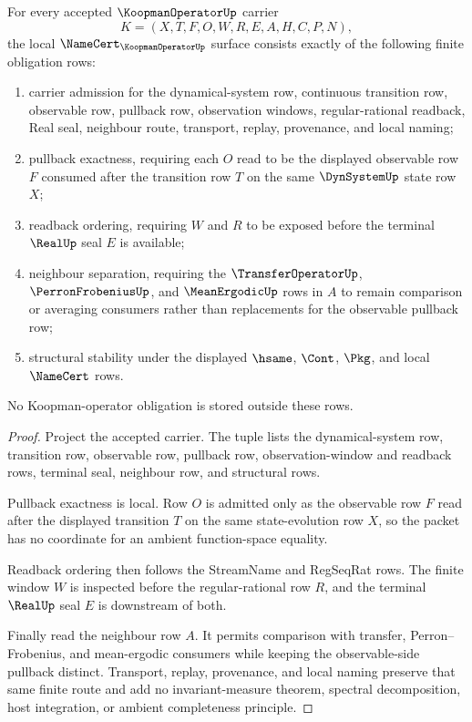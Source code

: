 \begin{theorem}
\label{thm:koopman-operator-namecert-obligations}
For every accepted $\KoopmanOperatorUp$ carrier
$$
K=(X,T,F,O,W,R,E,A,H,C,P,N),
$$
the local $\NameCert_{\KoopmanOperatorUp}$ surface consists exactly of the following finite obligation rows:
\begin{enumerate}
\item carrier admission for the dynamical-system row, continuous transition row, observable row, pullback row, observation windows, regular-rational readback, Real seal, neighbour route, transport, replay, provenance, and local naming;
\item pullback exactness, requiring each $O$ read to be the displayed observable row $F$ consumed after the transition row $T$ on the same $\DynSystemUp$ state row $X$;
\item readback ordering, requiring $W$ and $R$ to be exposed before the terminal $\RealUp$ seal $E$ is available;
\item neighbour separation, requiring the $\TransferOperatorUp$, $\PerronFrobeniusUp$, and $\MeanErgodicUp$ rows in $A$ to remain comparison or averaging consumers rather than replacements for the observable pullback row;
\item structural stability under the displayed $\hsame$, $\Cont$, $\Pkg$, and local $\NameCert$ rows.
\end{enumerate}
No Koopman-operator obligation is stored outside these rows.
\end{theorem}
\begin{proof}
Project the accepted carrier. The tuple lists the dynamical-system row, transition row, observable row, pullback row, observation-window and readback rows, terminal seal, neighbour row, and structural rows.

Pullback exactness is local. Row $O$ is admitted only as the observable row $F$ read after the displayed transition $T$ on the same state-evolution row $X$, so the packet has no coordinate for an ambient function-space equality.

Readback ordering then follows the StreamName and RegSeqRat rows. The finite window $W$ is inspected before the regular-rational row $R$, and the terminal $\RealUp$ seal $E$ is downstream of both.

Finally read the neighbour row $A$. It permits comparison with transfer, Perron--Frobenius, and mean-ergodic consumers while keeping the observable-side pullback distinct. Transport, replay, provenance, and local naming preserve that same finite route and add no invariant-measure theorem, spectral decomposition, host integration, or ambient completeness principle.
\end{proof}

